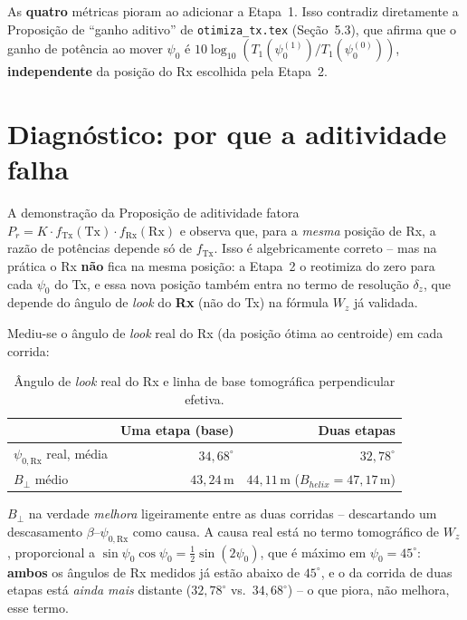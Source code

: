 \documentclass[12pt,a4paper,oneside]{book}
\newcommand{\atencion}[2]{%
  \begin{tcolorbox}[enhanced, breakable,
    colback=red!5, colframe=red!60!black,
    fonttitle=\bfseries\small,
    title={\protect#1}]
    #2
  \end{tcolorbox}}
\theoremstyle{definition}
\theoremstyle{remark}
\newcommand{\Prcv}{P_r}
\newcommand{\dz}{\delta_z}
\begin{document}
\atencion{Resultado contraintuitivo}{
As \textbf{quatro} métricas pioram ao adicionar a Etapa~1. Isso contradiz
diretamente a Proposição de ``ganho aditivo'' de \texttt{otimiza\_tx.tex}
(Seção~5.3), que afirma que o ganho de potência ao mover $\psi_0$ é
$10\log_{10}(T_1(\psi_0^{(1)})/T_1(\psi_0^{(0)}))$,
\textbf{independente} da posição do Rx escolhida pela Etapa~2.
}

\section{Diagnóstico: por que a aditividade falha}

A demonstração da Proposição de aditividade fatora $\Prcv=K\cdot
f_{\mathrm{Tx}}(\mathrm{Tx})\cdot f_{\mathrm{Rx}}(\mathrm{Rx})$ e observa
que, para a \emph{mesma} posição de Rx, a razão de potências depende só de
$f_{\mathrm{Tx}}$. Isso é algebricamente correto -- mas na prática o Rx
\textbf{não} fica na mesma posição: a Etapa~2 o reotimiza do zero para cada
$\psi_0$ do Tx, e essa nova posição também entra no termo de resolução
$\dz$, que depende do ângulo de \textit{look} do \textbf{Rx} (não do Tx) na
fórmula $W_z$ já validada.

Mediu-se o ângulo de \textit{look} real do Rx (da posição ótima ao
centroide) em cada corrida:

\begin{table}[H]
\centering
\caption{Ângulo de \textit{look} real do Rx e linha de base tomográfica
perpendicular efetiva.}
\begin{tabular}{lrr}
\toprule
& Uma etapa (base) & Duas etapas \\
\midrule
$\psi_{0,\mathrm{Rx}}$ real, média & $34{,}68^\circ$ & $32{,}78^\circ$ \\
$B_\perp$ médio & $43{,}24\,\mathrm{m}$ & $44{,}11\,\mathrm{m}$ ($B_{helix}=47{,}17\,\mathrm{m}$) \\
\bottomrule
\end{tabular}
\end{table}

$B_\perp$ na verdade \emph{melhora} ligeiramente entre as duas corridas --
descartando um descasamento $\beta$--$\psi_{0,\mathrm{Rx}}$ como causa. A
causa real está no termo tomográfico de $W_z$, proporcional a
$\sin\psi_0\cos\psi_0=\tfrac12\sin(2\psi_0)$, que é máximo em
$\psi_0=45^\circ$: \textbf{ambos} os ângulos de Rx medidos já estão abaixo
de $45^\circ$, e o da corrida de duas etapas está \emph{ainda mais}
distante ($32{,}78^\circ$ vs.\ $34{,}68^\circ$) -- o que piora, não
melhora, esse termo.
\end{document}
